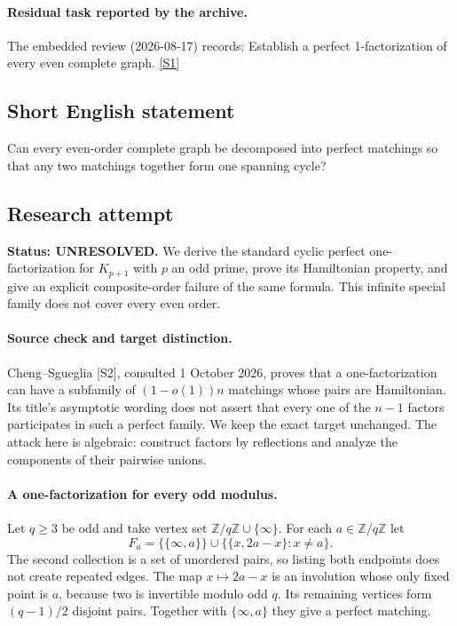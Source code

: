 \documentclass[11pt,a4paper]{article}
\newcommand{\sref}[2]{\hyperlink{source:#1:#2}{[S#2]}}
\begin{document}
\paragraph{Residual task reported by the archive.}

The embedded review (2026-08-17) records: Establish a perfect 1-factorization of every even complete graph. \sref{1394}{1}

\subsection{Short English statement}

Can every even-order complete graph be decomposed into perfect matchings so that any two matchings together form one spanning cycle?

\subsection{Research attempt}
\textbf{Status: UNRESOLVED.} We derive the standard cyclic perfect one-factorization for $K_{p+1}$ with $p$ an odd prime, prove its Hamiltonian property, and give an explicit composite-order failure of the same formula. This infinite special family does not cover every even order.

\paragraph{Source check and target distinction.}
Cheng--Sgueglia [S2], consulted 1 October 2026, proves that a one-factorization can have a subfamily of $(1-o(1))n$ matchings whose pairs are Hamiltonian. Its title's asymptotic wording does not assert that every one of the $n-1$ factors participates in such a perfect family. We keep the exact target unchanged. The attack here is algebraic: construct factors by reflections and analyze the components of their pairwise unions.

\paragraph{A one-factorization for every odd modulus.}
Let $q\ge3$ be odd and take vertex set $\mathbb Z/q\mathbb Z\cup\{\infty\}$. For each $a\in\mathbb Z/q\mathbb Z$ let
\[
F_a=\{\{\infty,a\}\}\cup
\{\{x,2a-x\}:x\ne a\}.
\]
The second collection is a set of unordered pairs, so listing both endpoints does not create repeated edges. The map $x\mapsto2a-x$ is an involution whose only fixed point is $a$, because two is invertible modulo odd $q$. Its remaining vertices form $(q-1)/2$ disjoint pairs. Together with $\{\infty,a\}$ they give a perfect matching.
\end{document}
